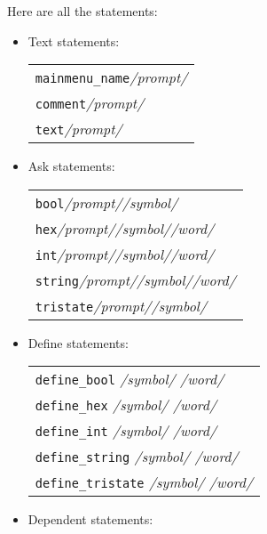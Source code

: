 Here are all the statements:

\begin{itemize}

\item Text statements:

\begin{tabular}{l}
 \texttt{mainmenu\_name}\quad\textit{/prompt/}\\
 \texttt{comment}\quad\textit{/prompt/}\\
 \texttt{text}\quad\textit{/prompt/}\\
\end{tabular}

\item  Ask statements:

\begin{tabular}{l}
 \texttt{bool}\quad\textit{/prompt/}\quad\textit{/symbol/}\\
 \texttt{hex}\quad\textit{/prompt/}\quad\textit{/symbol/}\quad\textit{/word/}\\
 \texttt{int}\quad\textit{/prompt/}\quad\textit{/symbol/}\quad\textit{/word/}\\
 \texttt{string}\quad\textit{/prompt/}\quad\textit{/symbol/}\quad\textit{/word/}\\
 \texttt{tristate}\quad\textit{/prompt/}\quad\textit{/symbol/}\\
\end{tabular}

\item  Define statements:

\begin{tabular}{l}
 \texttt{define\_bool}     \quad\textit{/symbol/} \quad\textit{/word/}\\
 \texttt{define\_hex}      \quad\textit{/symbol/} \quad\textit{/word/}\\
 \texttt{define\_int}      \quad\textit{/symbol/} \quad\textit{/word/}\\
 \texttt{define\_string}   \quad\textit{/symbol/} \quad\textit{/word/}\\
 \texttt{define\_tristate}  \quad\textit{/symbol/} \quad\textit{/word/}\\
\end{tabular}

\item  Dependent statements:


\end{itemize}
